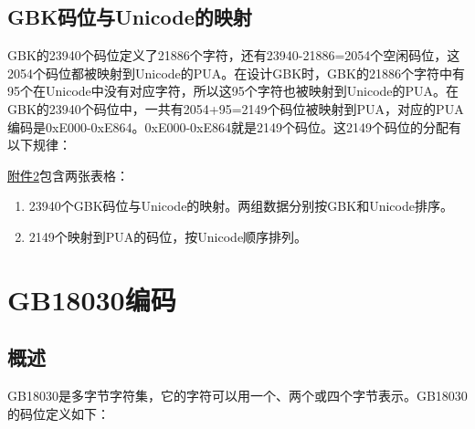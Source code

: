 \documentclass[cn,hazy,blue,14pt,screen]{elegantnote}
\begin{document}
\hypertarget{gbkux7801ux4f4dux4e0eunicodeux7684ux6620ux5c04}{%
\subsection{GBK码位与Unicode的映射}\label{gbkux7801ux4f4dux4e0eunicodeux7684ux6620ux5c04}}

GBK的23940个码位定义了21886个字符，还有23940-21886=2054个空闲码位，这2054个码位都被映射到Unicode的PUA。在设计GBK时，GBK的21886个字符中有95个在Unicode中没有对应字符，所以这95个字符也被映射到Unicode的PUA。在GBK的23940个码位中，一共有2054+95=2149个码位被映射到PUA，对应的PUA编码是0xE000-0xE864。0xE000-0xE864就是2149个码位。这2149个码位的分配有以下规律：


\href{samples/gbkcode.zip}{附件2}包含两张表格：

\begin{enumerate}

\item
  23940个GBK码位与Unicode的映射。两组数据分别按GBK和Unicode排序。
\item
  2149个映射到PUA的码位，按Unicode顺序排列。
\end{enumerate}

\hypertarget{gb18030ux7f16ux7801}{%
\section{GB18030编码}\label{gb18030ux7f16ux7801}}

\hypertarget{ux6982ux8ff0}{%
\subsection{概述}\label{ux6982ux8ff0}}

GB18030是多字节字符集，它的字符可以用一个、两个或四个字节表示。GB18030的码位定义如下：
\end{document}
